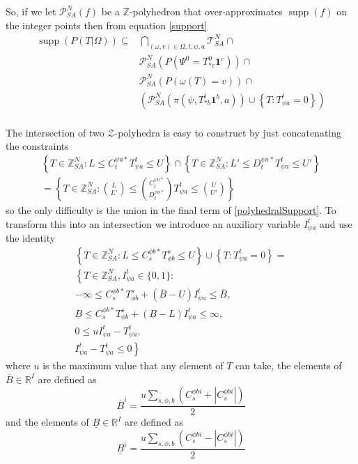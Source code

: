 \documentclass{article}
\DeclareMathOperator\supp{supp}
\begin{document}
So, if we let $\mathcal{P}^N_{SA}(f)$ be a $\mathbb{Z}$-polyhedron that over-approximates $\supp(f)$ on the integer points then from equation \eqref{support}
\begin{equation}
\begin{aligned}
\supp(P( T |\Omega)) \subseteq 
& \bigcap_{(\omega,v) \in \Omega,t,\psi, a} \mathcal{T}^N_{SA} \cap \\
& \mathcal{P}^N_{SA}(P(\Psi^0 = T^0_{* c}\mathbf{1}^c)) \cap\\
&    \mathcal{P}^N_{SA}\left(P\left(\omega(T)=v\right)\right) \cap \\
& 
\left(\mathcal{P}^N_{SA}\left(\pi(\psi,T^t_{* b}\mathbf{1}^b,a)\right)
\cup
\left\{T: T^t_{\psi a} = 0\right\}\right)
\\
\end{aligned}
\label{polyhedralSupport}
\end{equation}

The intersection of two $\mathcal{Z}$-polyhedra is easy to construct by just concatenating the constraints
\begin{multline}
\left\{ T\in\mathbb{\mathbb{Z}}^N_{SA} : L \le C^{\psi a*}_{t} T^t_{\psi a} \le U \right\}
\cap \left\{ T\in\mathbb{\mathbb{Z}}^N_{SA} : L' \le D^{\psi a *}_{t} T^t_{\psi a} \le U' \right\} \\
= \left\{ T\in\mathbb{\mathbb{Z}}^N_{SA} : {L \choose L'}  \le  {C^{\psi a*}_t \choose D^{\psi a*}_t} T^t_{\psi a} \le {U \choose U'} \right\}
\end{multline}
so the only difficulty is the union in the final term of \eqref{polyhedralSupport}. To transform this into an intersection we introduce an auxiliary variable $I^t_{\psi a}$ and use the identity
\begin{multline}
\left\{ T\in\mathbb{Z}^N_{SA} : L \le C^{\phi b*}_{s} T^s_{\phi b} \le U \right\}
\cup
\left\{T: T^t_{\psi a} = 0\right\}
=\\
\left\{
T\in\mathbb{Z}^N_{SA}, I^t_{\psi a}\in\{0,1\}:\right.\\
-\infty \le C^{\phi b *}_{s} T^s_{\phi b}
+
(\overline{B}-U)I^{t}_{\psi a}
\le \overline{B},\\
\underline{B} \le C^{\phi b *}_{s} T^s_{\phi b}
+
(\underline{B}-L)I^{t}_{\psi a} \le \infty,\\
0 \le uI^t_{\psi a} - T^t_{\psi a},\\
\left. I^t_{\psi a} - T^t_{\psi a} \le 0
\right\}
\label{implication}
\end{multline}
where $u$ is the maximum value that any element of $T$ can take, the elements of $\overline{B}\in\mathbb{R}^I$ are defined as
\[
\overline{B}^i = \frac{u\sum_{s,\phi,b} \left( C^{\phi bi}_{s} + \left|C^{\phi bi}_{s}\right|\right)}{2}
\]
and the elements of $\underline{B}\in\mathbb{R}^I$ are defined as
\[
\underline{B}^i = \frac{u\sum_{s,\phi,b} \left(C^{\phi bi}_{s} - \left|C^{\phi bi}_{s}\right|\right)}{2}
\]
\end{document}
